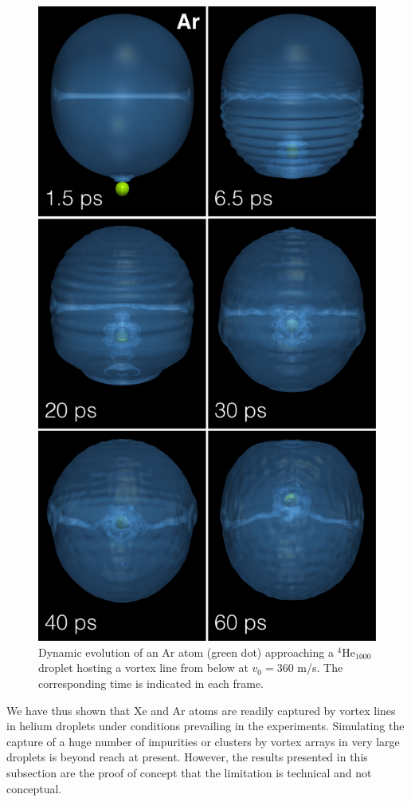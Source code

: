 \begin{figure}[h]
\centerline{\includegraphics[width=0.60\linewidth,clip]{fig11}}
\caption{\label{fig11-capture} 
Dynamic evolution of an Ar atom (green dot) approaching a $^4$He$_{1000}$ 
droplet  hosting a vortex line from below at $v_0 = 360$ m/s. The corresponding time is indicated in each frame.\citep{ESI}  
}
\end{figure}

 

We have thus shown that   Xe and Ar atoms are readily captured by vortex lines in helium droplets under conditions prevailing in the experiments.\citep{Gom14,Jon16} Simulating the 
capture of a huge number of  impurities or clusters by vortex arrays in  very large droplets is beyond reach at present. However, the results presented in
this subsection are the proof of concept that the limitation is technical and not conceptual.

